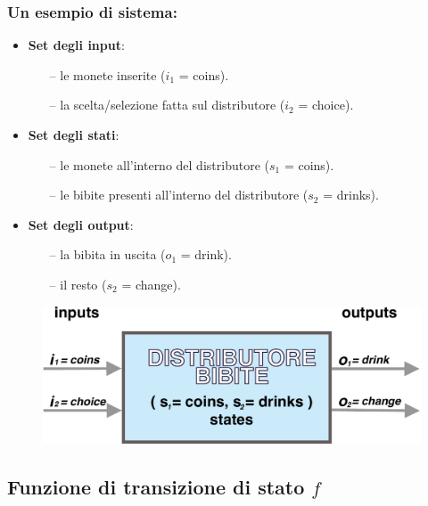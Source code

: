\begin{frame}
	\frametitle{Un esempio di sistema:}
	
		\begin{itemize}
			\item \textbf{Set degli input}:
				\begin{itemize}
					\item[--] le monete inserite ($i_1$ = coins).
					\item[--] la scelta/selezione fatta sul distributore ($i_2$ = choice).
				\end{itemize}
			\item \textbf{Set degli stati}:
				\begin{itemize}
					\item[--] le monete all'interno del distributore ($s_1$ = coins).
					\item[--] le bibite presenti all'interno del distributore ($s_2$ = drinks).
				\end{itemize}
			\item \textbf{Set degli output}:
				\begin{itemize}
					\item[--] la bibita in uscita ($o_1$ = drink).
					\item[--] il resto ($s_2$ = change).
				\end{itemize}
		\end{itemize}
		\vspace{1.5em}
		\begin{figure}[!htbp]
			\centering
			\includegraphics[width=0.60\linewidth]{images/1_i_sistemi/sistemaX3.pdf}
		\end{figure}
		\vspace{1.5em}
\end{frame}




\subsection[Funzione di transizione di stato $f$]{Funzione di transizione di stato $f$}


